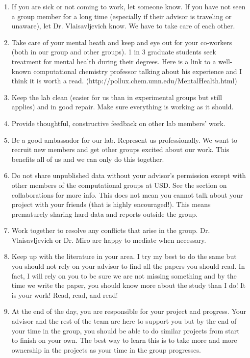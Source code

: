 \documentclass[letterpaper]{article}
\begin{document}
\begin{enumerate}
\item If you are sick or not coming to work, let someone know. If you have not seen a group member for a long time (especially if their advisor is traveling or unaware), let Dr. Vlaisavljevich know. We have to take care of each other.
\item Take care of your mental heath and keep and eye out for your co-workers (both in our group and other groups). 1 in 3 graduate students seek treatment for mental health during their degrees. Here is a link to a well-known computational chemistry professor talking about his experience and I think it is worth a read. (http://pollux.chem.umn.edu/MentalHealth.html)
\item Keep the lab clean (easier for us than in experimental groups but still applies) and in good repair. Make sure everything is working as it should.
\item Provide thoughtful, constructive feedback on other lab members' work.
\item Be a good ambassador for our lab. Represent us professionally. We want to recruit new members and get other groups excited about our work. This benefits all of us and we can only do this together.
\item Do not share unpublished data without your advisor's permission except with other members of the computational groups at USD. See the section on collaborations for more info. This does not mean you cannot talk about your project with your friends (that is highly encouraged!). This means prematurely sharing hard data and reports outside the group.
\item Work together to resolve any conflicts that arise in the group. Dr. Vlaisavljevich or Dr. Miro are happy to mediate when necessary.
\item Keep up with the literature in your area. I try my best to do the same but you should not rely on your advisor to find all the papers you should read. In fact, I will rely on you to be sure we are not missing something and by the time we write the paper, you should know more about the study than I do! It is your work! Read, read, and read!
\item At the end of the day, you are responsible for your project and progress. Your advisor and the rest of the team are here to support you but by the end of your time in the group, you should be able to do similar projects from start to finish on your own. The best way to learn this is to take more and more ownership in the projects as your time in the group progresses.
\end{enumerate}
\end{document}
